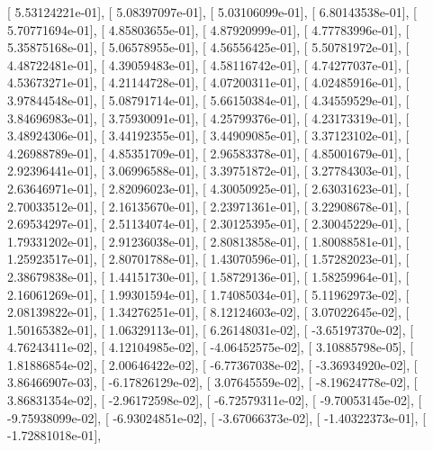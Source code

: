\documentclass{article}
\begin{document}
       [  5.53124221e-01],
       [  5.08397097e-01],
       [  5.03106099e-01],
       [  6.80143538e-01],
       [  5.70771694e-01],
       [  4.85803655e-01],
       [  4.87920999e-01],
       [  4.77783996e-01],
       [  5.35875168e-01],
       [  5.06578955e-01],
       [  4.56556425e-01],
       [  5.50781972e-01],
       [  4.48722481e-01],
       [  4.39059483e-01],
       [  4.58116742e-01],
       [  4.74277037e-01],
       [  4.53673271e-01],
       [  4.21144728e-01],
       [  4.07200311e-01],
       [  4.02485916e-01],
       [  3.97844548e-01],
       [  5.08791714e-01],
       [  5.66150384e-01],
       [  4.34559529e-01],
       [  3.84696983e-01],
       [  3.75930091e-01],
       [  4.25799376e-01],
       [  4.23173319e-01],
       [  3.48924306e-01],
       [  3.44192355e-01],
       [  3.44909085e-01],
       [  3.37123102e-01],
       [  4.26988789e-01],
       [  4.85351709e-01],
       [  2.96583378e-01],
       [  4.85001679e-01],
       [  2.92396441e-01],
       [  3.06996588e-01],
       [  3.39751872e-01],
       [  3.27784303e-01],
       [  2.63646971e-01],
       [  2.82096023e-01],
       [  4.30050925e-01],
       [  2.63031623e-01],
       [  2.70033512e-01],
       [  2.16135670e-01],
       [  2.23971361e-01],
       [  3.22908678e-01],
       [  2.69534297e-01],
       [  2.51134074e-01],
       [  2.30125395e-01],
       [  2.30045229e-01],
       [  1.79331202e-01],
       [  2.91236038e-01],
       [  2.80813858e-01],
       [  1.80088581e-01],
       [  1.25923517e-01],
       [  2.80701788e-01],
       [  1.43070596e-01],
       [  1.57282023e-01],
       [  2.38679838e-01],
       [  1.44151730e-01],
       [  1.58729136e-01],
       [  1.58259964e-01],
       [  2.16061269e-01],
       [  1.99301594e-01],
       [  1.74085034e-01],
       [  5.11962973e-02],
       [  2.08139822e-01],
       [  1.34276251e-01],
       [  8.12124603e-02],
       [  3.07022645e-02],
       [  1.50165382e-01],
       [  1.06329113e-01],
       [  6.26148031e-02],
       [ -3.65197370e-02],
       [  4.76243411e-02],
       [  4.12104985e-02],
       [ -4.06452575e-02],
       [  3.10885798e-05],
       [  1.81886854e-02],
       [  2.00646422e-02],
       [ -6.77367038e-02],
       [ -3.36934920e-02],
       [  3.86466907e-03],
       [ -6.17826129e-02],
       [  3.07645559e-02],
       [ -8.19624778e-02],
       [  3.86831354e-02],
       [ -2.96172598e-02],
       [ -6.72579311e-02],
       [ -9.70053145e-02],
       [ -9.75938099e-02],
       [ -6.93024851e-02],
       [ -3.67066373e-02],
       [ -1.40322373e-01],
       [ -1.72881018e-01],
\end{document}
